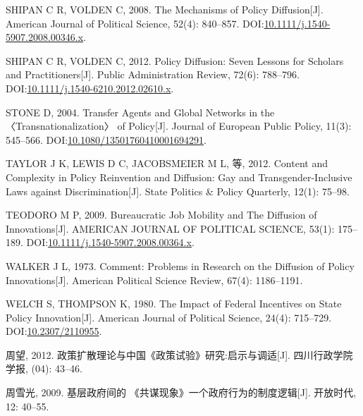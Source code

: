 \documentclass[
  12pt,
]{ctexart}
\newlength{\cslhangindent}
\newlength{\cslentryspacingunit} %
\newenvironment{CSLReferences}[2] %
 {%
  \setlength{\parindent}{0pt}
  \ifodd #1
  \let\oldpar\par
  \def\par{\hangindent=\cslhangindent\oldpar}
  \fi
  \setlength{\parskip}{#2\cslentryspacingunit}
 }%
 {}
\begin{document}
\begin{CSLReferences}{1}{0}
\leavevmode{}%
SHIPAN C R, VOLDEN C, 2008. The {Mechanisms} of {Policy Diffusion}{[}J{]}. American Journal of Political Science, 52(4): 840--857. DOI:\href{https://doi.org/10.1111/j.1540-5907.2008.00346.x}{10.1111/j.1540-5907.2008.00346.x}.

\leavevmode{}%
SHIPAN C R, VOLDEN C, 2012. Policy {Diffusion}: {Seven Lessons} for {Scholars} and {Practitioners}{[}J{]}. Public Administration Review, 72(6): 788--796. DOI:\href{https://doi.org/10.1111/j.1540-6210.2012.02610.x}{10.1111/j.1540-6210.2012.02610.x}.

\leavevmode{}%
STONE D, 2004. Transfer Agents and Global Networks in the {〈Transnationalization〉} of Policy{[}J{]}. Journal of European Public Policy, 11(3): 545--566. DOI:\href{https://doi.org/10.1080/13501760410001694291}{10.1080/13501760410001694291}.

\leavevmode{}%
TAYLOR J K, LEWIS D C, JACOBSMEIER M L, 等, 2012. Content and Complexity in Policy Reinvention and Diffusion: {Gay} and Transgender-Inclusive Laws against Discrimination{[}J{]}. State Politics \& Policy Quarterly, 12(1): 75--98.

\leavevmode{}%
TEODORO M P, 2009. Bureaucratic {Job Mobility} and {The Diffusion} of {Innovations}{[}J{]}. AMERICAN JOURNAL OF POLITICAL SCIENCE, 53(1): 175--189. DOI:\href{https://doi.org/10.1111/j.1540-5907.2008.00364.x}{10.1111/j.1540-5907.2008.00364.x}.

\leavevmode{}%
WALKER J L, 1973. Comment: {Problems} in Research on the Diffusion of Policy Innovations{[}J{]}. American Political Science Review, 67(4): 1186--1191.

\leavevmode{}%
WELCH S, THOMPSON K, 1980. The {Impact} of {Federal Incentives} on {State Policy Innovation}{[}J{]}. American Journal of Political Science, 24(4): 715--729. DOI:\href{https://doi.org/10.2307/2110955}{10.2307/2110955}.

\leavevmode{}%
周望, 2012. {政策扩散理论与中国{《政策试验》}研究:启示与调适}{[}J{]}. 四川行政学院学报, (04): 43--46.

\leavevmode{}%
周雪光, 2009. 基层政府间的 {《共谋现象》}\textemdash\textemdash 一个政府行为的制度逻辑{[}J{]}. 开放时代, 12: 40--55.


\end{CSLReferences}
\end{document}

